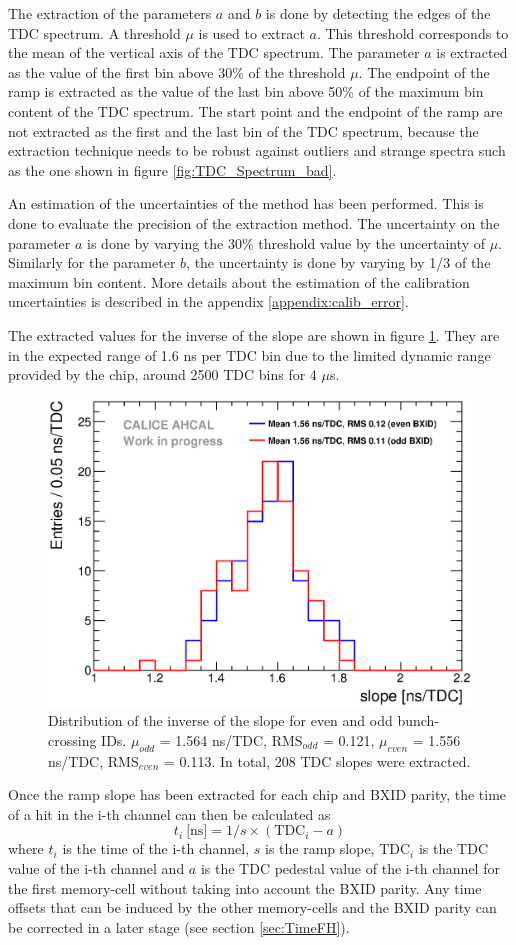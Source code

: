 The extraction of the parameters $a$ and $b$ is done by detecting the edges of the TDC spectrum. A threshold $\mu$ is used to extract $a$. This threshold corresponds to the mean of the vertical axis of the TDC spectrum. The parameter $a$ is extracted as the value of the first bin above 30\% of the threshold $\mu$. The endpoint of the ramp is extracted as the value of the last bin above 50\% of the maximum bin content of the TDC spectrum. The start point and the endpoint of the ramp are not extracted as the first and the last bin of the TDC spectrum, because the extraction technique needs to be robust against outliers and strange spectra such as the one shown in figure \ref{fig:TDC_Spectrum_bad}.

An estimation of the uncertainties of the method has been performed. This is done to evaluate the precision of the extraction method. The uncertainty on the parameter $a$ is done by varying the 30\% threshold value by the uncertainty of $\mu$. Similarly for the parameter $b$, the uncertainty is done by varying by 1/3 of the maximum bin content. More details about the estimation of the calibration uncertainties is described in the appendix \ref{appendix:calib_error}.

The extracted values for the inverse of the slope are shown in figure \ref{fig:slope_time}. They are in the expected range of 1.6 ns per TDC bin due to the limited dynamic range provided by the chip, around 2500 TDC bins for 4 $\mu$s.

\begin{figure}[htbp!]
	\centering
	\includegraphics[width=0.5\linewidth]{../Thesis_Plots/Timing/Muons/Plots/SlopesTDC.eps}
	\caption{Distribution of the inverse of the slope for even and odd bunch-crossing IDs. $\mu_{odd}$ = 1.564 ns/TDC, RMS$_{odd}$ = 0.121, $\mu_{even}$ = 1.556 ns/TDC, RMS$_{even}$ = 0.113. In total, 208 TDC slopes were extracted.} \label{fig:slope_time}
\end{figure}

Once the ramp slope has been extracted for each chip and BXID parity, the time of a hit in the i-th channel can then be calculated as
\begin{equation} \label{eq:time_chn}
	t_{i} \: \text{[ns]} = 1/s \times (\text{TDC}_{i} - a)
\end{equation}
where $t_{i}$ is the time of the i-th channel, $s$ is the ramp slope, TDC$_{i}$ is the TDC value of the i-th channel and $a$ is the TDC pedestal value of the i-th channel for the first memory-cell without taking into account the BXID parity. Any time offsets that can be induced by the other memory-cells and the BXID parity can be corrected in a later stage (see section \ref{sec:TimeFH}).

